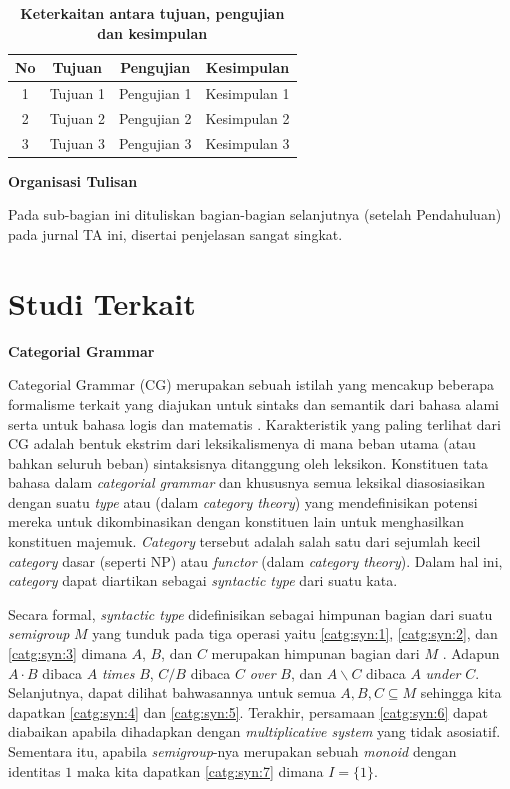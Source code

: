 \begin{table}[h!]
\caption{\textbf{Keterkaitan antara tujuan, pengujian dan kesimpulan}}
\label{table:1}%
\centering
\begin{tabular}{| c | c  | c | c |} 
 \hline
 \textbf{No} & \textbf{Tujuan} & \textbf{Pengujian} & \textbf{Kesimpulan} \\ [0.5ex] 
 \hline
 1 & Tujuan 1 & Pengujian 1 & Kesimpulan 1 \\ 
 2 & Tujuan 2 & Pengujian 2 & Kesimpulan 2 \\ 
 3 & Tujuan 3 & Pengujian 3 & Kesimpulan 3 \\  [1ex] 
 \hline
\end{tabular}

\end{table}

\noindent \textbf{Organisasi Tulisan}

Pada sub-bagian ini dituliskan bagian-bagian selanjutnya (setelah Pendahuluan) pada jurnal TA ini, disertai penjelasan sangat singkat.



\section{Studi Terkait}

\noindent\textbf{Categorial Grammar}

Categorial Grammar (CG) merupakan sebuah istilah yang mencakup beberapa formalisme terkait yang diajukan
untuk sintaks dan semantik dari bahasa alami serta untuk bahasa logis dan matematis \citep{Steedman92catg}.
Karakteristik yang paling terlihat dari CG adalah bentuk ekstrim dari leksikalismenya di mana beban utama
(atau bahkan seluruh beban) sintaksisnya ditanggung oleh leksikon.
Konstituen tata bahasa dalam \textit{categorial grammar} dan khususnya semua leksikal diasosiasikan
dengan suatu \textit{type} atau  (dalam \textit{category theory}) yang
mendefinisikan potensi mereka untuk dikombinasikan dengan konstituen lain untuk menghasilkan konstituen
majemuk.
\textit{Category} tersebut adalah salah satu dari sejumlah kecil \textit{category} dasar (seperti NP)
atau \textit{functor} (dalam \textit{category theory}).
Dalam hal ini, \textit{category} dapat diartikan sebagai \textit{syntactic type} dari suatu kata.

Secara formal, \textit{syntactic type} didefinisikan sebagai himpunan bagian dari suatu
\textit{semigroup} $M$ yang tunduk pada tiga operasi yaitu \ref{catg:syn:1},
\ref{catg:syn:2}, dan \ref{catg:syn:3} dimana $A$, $B$, dan $C$ merupakan himpunan bagian dari $M$
\cite{Lambek1988}. Adapun $A \cdot B$ dibaca $A$ \textit{times} $B$, $C/B$ dibaca $C$ \textit{over}
$B$, dan $A\backslash{}C$ dibaca $A$ \textit{under} $C$. Selanjutnya, dapat dilihat bahwasannya
untuk semua $A, B, C \subseteq M$ sehingga kita dapatkan \ref{catg:syn:4} dan \ref{catg:syn:5}.
Terakhir, persamaan \ref{catg:syn:6} dapat diabaikan apabila dihadapkan dengan
\textit{multiplicative system} yang tidak asosiatif. Sementara itu, apabila \textit{semigroup}-nya
merupakan sebuah \textit{monoid} dengan identitas $1$ maka kita dapatkan \ref{catg:syn:7} dimana
$I = \{1\}$.

